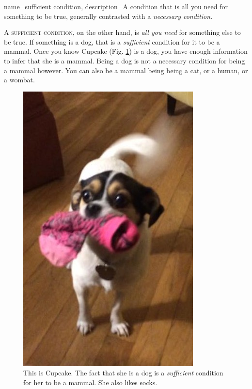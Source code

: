{
name=sufficient condition,
description={A condition that is all you need for something to be true, generally contrasted with a \textit{necessary condition}.}
}

A \textsc{\gls{sufficient condition}}\label{def:sufficient_condition}, on the other hand, is \textit{all you need} for something else to be true. If something is a dog, that is a \textit{sufficient} condition for it to be a mammal. Once you know Cupcake (Fig. \ref{fig:cupcake}) is a dog, you have enough information to infer that she is a mammal. Being a dog is not a necessary condition for being a mammal however. You can also be a mammal being being a cat, or a human, or a wombat.

\begin{figure}
\begin{mdframed}[style=mytableclearbox]
\begin{center}
\includegraphics*{img/cupcake}
\end{center}
\end{mdframed}
\caption{This is Cupcake. The fact that she is a dog is a \textit{sufficient} condition for her to be a mammal. She also likes socks.}
\label{fig:cupcake}
\end{figure}

